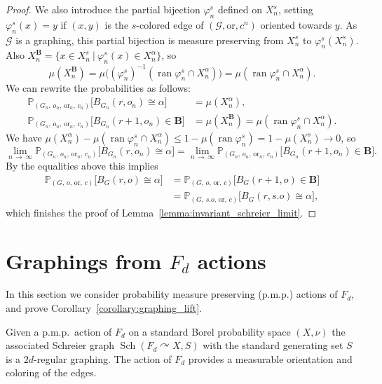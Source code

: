 \documentclass[11pt]{article}
\theoremstyle{definition}
\numberwithin{equation}{section}
\numberwithin{figure}{section}
\numberwithin{table}{section}
\newcommand{\bfB}{\mathbf{B}}
\newcommand{\bbP}{\mathbb{P}}
\newcommand{\G}{\mathcal{G}}
\newcommand{\orl}{\mathrm{or}}
\DeclareMathOperator{\Sch}{Sch}
\DeclareMathOperator{\ran}{ran}
\newcommand{\acts}{\curvearrowright}
\begin{document}
\begin{proof}
We also introduce the partial bijection $\varphi^s_n$ defined on $X^s_n$, setting $\varphi^s_n(x) = y$ if $(x,y)$ is the $s$-colored edge of $(\G,\orl,c^n)$ oriented towards $y$. As $\G$ is a graphing, this partial bijection is measure preserving from $X^s_n$ to $\varphi^s_n(X^s_n)$. Also $X^{\bfB}_n = \{x \in X^s_n~|~\varphi^s_n(x) \in X^{\alpha}_n\}$, so
\[
\mu\left(X^{\bfB}_n\right) = \mu\big(\left(\varphi^s_n\right)^{-1}\left(\ran\varphi^s_n \cap X^{\alpha}_n \right)\big) = \mu\left(\ran\varphi^s_n \cap X^{\alpha}_n\right).
\]
We can rewrite the probabilities as follows:
\begin{align*}
\bbP_{\left(G_n,\,o_n,\,\orl_n,\,c_n\right)}\big[B_{G_n}\left(r,o_n\right) \cong \alpha\big] &= \mu\left(X^{\alpha}_n\right),
\\
\bbP_{\left(G_n,\,o_n,\,\orl_n,\,c_n\right)}\big[B_{G_n}\left(r+1,o_n\right) \in \bfB\big] &= \mu\left(X^{\bfB}_n\right) = \mu\left(\ran\varphi^s_n \cap X^{\alpha}_n\right).
\end{align*}
We have $\mu(X^{\alpha}_n) - \mu(\ran\varphi^s_n \cap X^{\alpha}_n) \leq 1- \mu(\ran\varphi^s_n) = 1- \mu(X^s_n) \to 0$, so
\[
\lim_{n\,\to\,\infty} \bbP_{\left(G_n,\,o_n,\,\orl_n,\,c_n\right)}\big[B_{G_n}\left(r,o_n\right) \cong \alpha\big] = \lim_{n\,\to\,\infty}
\bbP_{\left(G_n,\,o_n,\,\orl_n,\,c_n\right)}\big[B_{G_n}\left(r+1,o_n\right) \in \bfB\big].
\]
By the equalities above this implies
\begin{align*}
\bbP_{\left(G,\,o,\,\orl,\,c\right)}\big[B_G(r,o) \cong \alpha\big] &= \bbP_{\left(G,\,o,\,\orl,\,c\right)}\big[B_G(r+1,o) \in \bfB\big] \\
&= \bbP_{\left(G,\,s.o,\,\orl,\,c\right)}\big[B_G(r,s.o) \cong \alpha\big],
\end{align*}
which finishes the proof of Lemma~\ref{lemma:invariant_schreier_limit}.
\end{proof}

\section{Graphings from \texorpdfstring{$F_d$}{Fd} actions} \label{section:graphings}

In this section we consider probability measure preserving (p.m.p.) actions of $F_d$, and prove Corollary~\ref{corollary:graphing_lift}.

Given a p.m.p.\ action of $F_d$ on a standard Borel probability space $(X, \nu)$ the associated Schreier graph $\Sch(F_d \acts X, S)$ with the standard generating set $S$ is a $2d$-regular graphing. The action of $F_d$ provides a measurable orientation and coloring of the edges.
\end{document}
